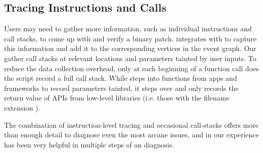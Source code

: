 \subsection{Tracing Instructions and Calls}

Users may need to gather more information, such as individual instructions and
call stacks, to come up with and verify a binary patch. \xxx integrates with
 to capture this information and add it to the corresponding
vertices in the event graph. Our  gather call stacks at
relevant locations and parameters tainted by user inputs. To reduce the data
collection overhead, only at each beginning of a function call does the script
record a full call stack. While  steps into functions from apps and
frameworks to record parameters tainted, it steps over and only records the
return value of APIs from low-level libraries (i.e. those with the filename
extension ).

The combination of instruction-level tracing and occasional call-stacks offers
more than enough detail to diagnose even the most arcane issues, and in our
experience has been very helpful in multiple steps of an \xxx diagnosis.
